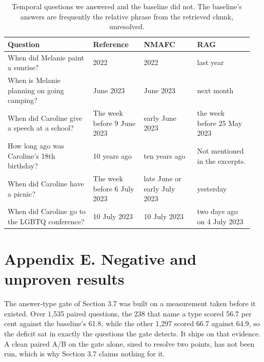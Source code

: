 \documentclass[10pt,a4paper,twocolumn]{article}
\begin{document}
\begin{table}[tb]
\centering
\caption{Temporal questions we answered and the baseline did not. The baseline's answers are frequently the relative phrase from the retrieved chunk, unresolved.}\label{table:temwin}
\small
\begin{tabular}{p{0.329\linewidth}p{0.197\linewidth}p{0.205\linewidth}p{0.219\linewidth}}
\toprule
Question & Reference & NMAFC & RAG \\
\midrule
When did Melanie paint a sunrise? & 2022 & 2022 & last year \\
When is Melanie planning on going camping? & June 2023 & June 2023 & next month \\
When did Caroline give a speech at a school? & The week before 9 June 2023 & early June 2023 & the week before 25 May 2023 \\
How long ago was Caroline's 18th birthday? & 10 years ago & ten years ago & Not mentioned in the excerpts. \\
When did Caroline have a picnic? & The week before 6 July 2023 & late June or early July 2023 & yesterday \\
When did Caroline go to the LGBTQ conference? & 10 July 2023 & 10 July 2023 & two days ago on 4 July 2023 \\
\bottomrule
\end{tabular}
\end{table}

\section*{Appendix E. Negative and unproven results}

The answer-type gate of Section 3.7 was built on a measurement taken before it existed. Over 1,535 paired questions, the 238 that name a type scored 56.7 per cent against the baseline's 61.8, while the other 1,297 scored 66.7 against 64.9, so the deficit sat in exactly the questions the gate detects. It ships on that evidence. A clean paired A/B on the gate alone, sized to resolve two points, has not been run, which is why Section 3.7 claims nothing for it.
\end{document}
